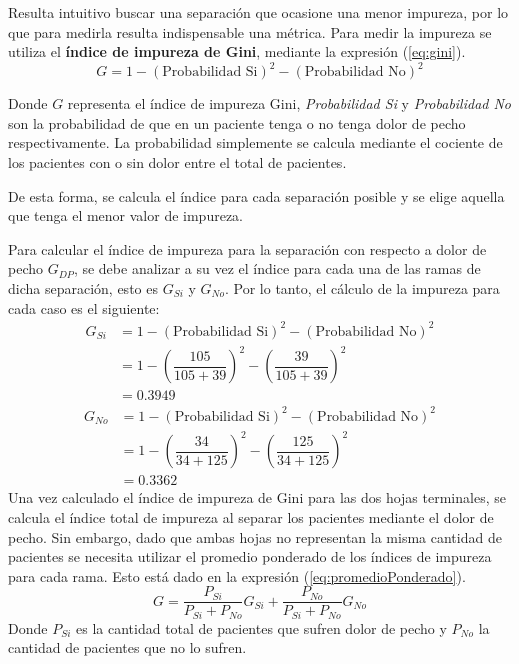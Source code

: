\documentclass[
10pt, %
a4paper, %
]{article}
\begin{document}
Resulta intuitivo buscar una separación que ocasione una menor impureza, por lo que para medirla resulta indispensable una métrica. Para medir la impureza se utiliza el
\textbf{índice de impureza de Gini}\cite{breiman2017classification}\cite{gelfand}, mediante la expresión (\ref{eq:gini}). 
\begin{equation}
	G = 1 - (\mbox{Probabilidad Si})^2 - (\mbox{Probabilidad No})^2 
	\label{eq:gini}
\end{equation}

Donde $G$ representa el índice de impureza Gini, \textit{Probabilidad Si} y \textit{Probabilidad No} son la probabilidad de que en un paciente tenga o no tenga dolor 
de pecho respectivamente. La probabilidad simplemente se calcula mediante el cociente de los pacientes con o sin dolor entre el total de pacientes.

De esta forma, se calcula el índice para cada separación posible y se elige aquella que tenga el menor valor de impureza. 

Para calcular el índice de impureza para la separación con respecto a dolor de pecho $G_{DP}$, se debe analizar a su vez el índice para cada una de las ramas de dicha
separación, esto es $G_{Si}$ y $G_{No}$. Por lo tanto, el cálculo de la impureza para cada caso es el siguiente:
\begin{align*}
	G_{Si} &= 1 - (\mbox{Probabilidad Si})^2 - (\mbox{Probabilidad No})^2  \\
		&= 1-\left(\dfrac{105}{105+39}\right)^2 -\left(\dfrac{39}{105+39} \right)^2\\
		&= 0.3949
\end{align*}
\begin{align*}
	G_{No} &= 1- (\mbox{Probabilidad Si})^2 - (\mbox{Probabilidad No})^2  \\
		&= 1-\left(\dfrac{34}{34+125}\right)^2 -\left(\dfrac{125}{34+125} \right)^2\\
		&= 0.3362
\end{align*}
Una vez calculado el índice de impureza de Gini para las dos hojas terminales, se calcula el índice total de impureza al separar los pacientes mediante el 
dolor de pecho.
Sin embargo, dado que ambas hojas no representan la misma cantidad de pacientes se necesita utilizar el promedio ponderado de los índices de impureza para 
cada rama. Esto está dado en la expresión (\ref{eq:promedioPonderado}).
\begin{equation}
	G = \dfrac{P_{Si}}{P_{Si} + P_{No}}G_{Si} + \dfrac{P_{No}}{P_{Si}+P_{No}}G_{No}
	\label{eq:promedioPonderado}
\end{equation}
Donde $P_{Si}$ es la cantidad total de pacientes que sufren dolor de pecho y $P_{No}$ la cantidad de pacientes que no lo sufren. 
\end{document}
